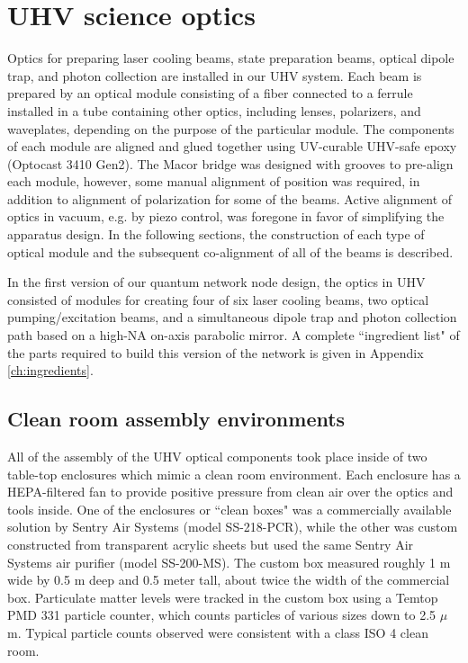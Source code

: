 \section{UHV science optics}\label{sec:science_optics}

Optics for preparing laser cooling beams, state preparation beams, optical dipole trap, and photon collection are installed in our UHV system. Each beam is prepared by an optical module consisting of a fiber connected to a ferrule installed in a tube containing other optics, including lenses, polarizers, and waveplates, depending on the purpose of the particular module. The components of each module are aligned and glued together using UV-curable UHV-safe epoxy (Optocast 3410 Gen2). The Macor bridge was designed with grooves to pre-align each module, however, some manual alignment of position was required, in addition to alignment of polarization for some of the beams. Active alignment of optics in vacuum, e.g. by piezo control, was foregone in favor of simplifying the apparatus design. In the following sections, the construction of each type of optical module and the subsequent co-alignment of all of the beams is described. 

In the first version of our quantum network node design, the optics in UHV consisted of modules for creating four of six laser cooling beams, two optical pumping/excitation beams, and a simultaneous dipole trap and photon collection path based on a high-NA on-axis parabolic mirror. A complete ``ingredient list" of the parts required to build this version of the network is given in Appendix \ref{ch:ingredients}.

\subsection{Clean room assembly environments}

All of the assembly of the UHV optical components took place inside of two table-top enclosures which mimic a clean room environment. Each enclosure has a HEPA-filtered fan to provide positive pressure from clean air over the optics and tools inside. One of the enclosures or ``clean boxes" was a commercially available solution by Sentry Air Systems (model SS-218-PCR), while the other was custom constructed from transparent acrylic sheets but used the same Sentry Air Systems air purifier (model SS-200-MS). The custom box measured roughly 1 m wide by 0.5 m deep and 0.5 meter tall, about twice the width of the commercial box. Particulate matter levels were tracked in the custom box using a Temtop PMD 331 particle counter, which counts particles of various sizes down to 2.5 $\mu$m. Typical particle counts observed were consistent with a class ISO 4 clean room.

